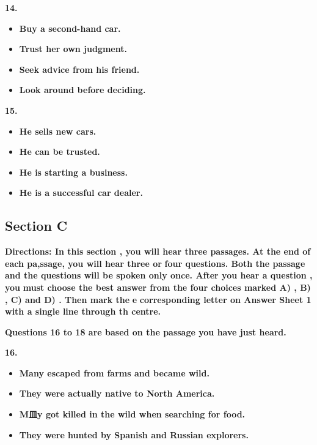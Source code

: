 \documentclass[UTF8,11pt]{ctexart}
\begin{document}
\textbf{14.}


\begin{itemize}[leftmargin=2em,itemsep=.2em,topsep=.4em]\item[A.] \textbf{Buy a second-hand car.}
\item[B.] \textbf{Trust her own judgment.}
\item[C.] \textbf{Seek advice from his friend.}
\item[D.] \textbf{Look around before deciding.}
\end{itemize}

\textbf{15.}


\begin{itemize}[leftmargin=2em,itemsep=.2em,topsep=.4em]\item[A.] \textbf{He sells new cars.}
\item[B.] \textbf{He can be trusted.}
\item[C.] \textbf{He is starting a business.}
\item[D.] \textbf{He is a successful car dealer.}
\end{itemize}

\subsection*{\textbf{Section }C}


\textbf{Directions: In this section , you will hear three passages. At the end of each pa,ssage, you will hear three or} \textbf{four questions. Both the passage and the questions will be spoken only once. After you hear a question , you} \textbf{must choose the best answer from the four choices marked A) , B) , C) and D) . Then mark the} \textbf{e} \textbf{corresponding letter on Answer Sheet 1 with a single line through th centre.}


\textbf{Questions 16 to 18 are based on the passage you have just heard.}


\textbf{16.}


\begin{itemize}[leftmargin=2em,itemsep=.2em,topsep=.4em]\item[A.] \textbf{Many escaped from farms and became wild.}
\item[B.] \textbf{They were actually native to North America.}
\item[C.] \textbf{M皿y got killed in the wild when searching for food.}
\item[D.] \textbf{They were hunted by Spanish and Russian explorers.}
\end{itemize}
\end{document}

